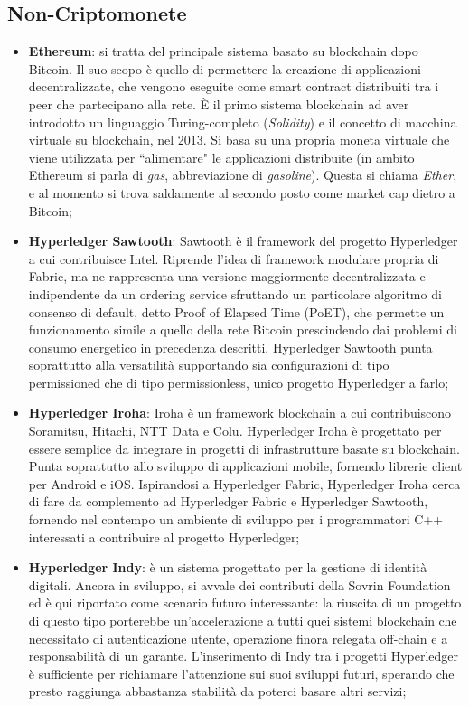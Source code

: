     \subsection{Non-Criptomonete}
        \begin{itemize}
            \item \textbf{Ethereum}: si tratta del principale sistema basato su blockchain dopo Bitcoin. Il suo scopo è quello di permettere la creazione di applicazioni decentralizzate, che vengono eseguite come smart contract distribuiti tra i peer che partecipano alla rete. È il primo sistema blockchain ad aver introdotto un linguaggio Turing-completo (\emph{Solidity}) e il concetto di macchina virtuale su blockchain, nel 2013. Si basa su una propria moneta virtuale che viene utilizzata per ``alimentare" le applicazioni distribuite (in ambito Ethereum si parla di \emph{gas}, abbreviazione di \emph{gasoline}). Questa si chiama \emph{Ether}, e al momento si trova saldamente al secondo posto come market cap dietro a Bitcoin;
            \item \textbf{Hyperledger Sawtooth}: Sawtooth è il framework del progetto Hyperledger a cui contribuisce Intel. Riprende l'idea di framework modulare propria di Fabric, ma ne rappresenta una versione maggiormente decentralizzata e indipendente da un ordering service sfruttando un particolare algoritmo di consenso di default, detto Proof of Elapsed Time (PoET), che permette un funzionamento simile a quello della rete Bitcoin prescindendo dai problemi di consumo energetico in precedenza descritti. Hyperledger Sawtooth punta soprattutto alla versatilità supportando sia configurazioni di tipo permissioned che di tipo permissionless, unico progetto Hyperledger a farlo;
            \item \textbf{Hyperledger Iroha}: Iroha è un framework blockchain a cui contribuiscono Soramitsu, Hitachi, NTT Data e Colu. Hyperledger Iroha è progettato per essere semplice da integrare in progetti di infrastrutture basate su blockchain. Punta soprattutto allo sviluppo di applicazioni mobile, fornendo librerie client per Android e iOS. Ispirandosi a Hyperledger Fabric, Hyperledger Iroha cerca di fare da complemento ad Hyperledger Fabric e Hyperledger Sawtooth, fornendo nel contempo un ambiente di sviluppo per i programmatori C++ interessati a contribuire al progetto Hyperledger;
            \item \textbf{Hyperledger Indy}: è un sistema progettato per la gestione di identità digitali. Ancora in sviluppo, si avvale dei contributi della Sovrin Foundation ed è qui riportato come scenario futuro interessante: la riuscita di un progetto di questo tipo porterebbe un'accelerazione a tutti quei sistemi blockchain che necessitato di autenticazione utente, operazione finora relegata off-chain e a responsabilità di un garante. L'inserimento di Indy tra i progetti Hyperledger è sufficiente per richiamare l'attenzione sui suoi sviluppi futuri, sperando che presto raggiunga abbastanza stabilità da poterci basare altri servizi;

\end{itemize}
